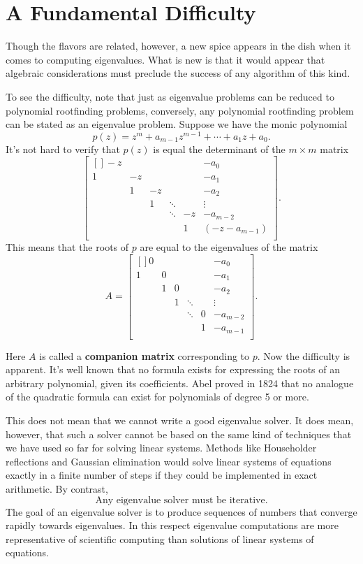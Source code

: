 \section{A Fundamental Difficulty} 
Though the flavors are related, however, a new spice appears in the dish when it comes to computing eigenvalues. What is new is that it would appear that algebraic considerations must preclude the success of any algorithm of this kind. 

To see the difficulty, note that just as eigenvalue problems can be reduced to polynomial rootfinding problems, conversely, any polynomial rootfinding problem can be stated as an eigenvalue problem. Suppose we have the monic polynomial 
\[
    p(z) = z^m + a_{m-1}z^{m-1} + \cdots + a_1z + a_0. 
\]
It's not hard to verify that $p(z)$ is equal the determinant of the $m\times m$ matrix 
\[
    \begin{bmatrix}[] 
        -z &  &  &  &  &  -a_0 \\
        1 & -z &  &  &  &  -a_1 \\
         & 1 & -z &  &  &  -a_2 \\
         &  & 1 & \ddots &  &  \vdots \\
         &  &  & \ddots & -z &  -a_{m-2} \\
         &  &  &  & 1 &  (-z-a_{m-1}) \\
    \end{bmatrix} . 
\]
This means that the roots of $p$ are equal to the eigenvalues of the matrix 
\[
    A = \begin{bmatrix}[] 
        0 &  &  &  &  &  -a_0 \\
        1 & 0 &  &  &  &  -a_1 \\
         & 1 & 0 &  &  &  -a_2 \\
         &  & 1 & \ddots &  &  \vdots \\
         &  &  & \ddots & 0 &  -a_{m-2} \\
         &  &  &  & 1 &  -a_{m-1} \\
    \end{bmatrix} . 
\]
     
Here $A$ is called a \textbf{companion matrix} corresponding to $p$.  Now the difficulty is apparent. It's well known that no formula exists for expressing the roots of an arbitrary polynomial, given its coefficients. Abel proved in 1824 that no analogue of the quadratic formula can exist for polynomials of degree 5 or more.  

This does not mean that we cannot write a good eigenvalue solver. It does mean, however, that such a solver cannot be based on the same kind of techniques that we have used so far for solving linear systems. Methods like Householder reflections and Gaussian elimination would solve linear systems of equations exactly in a finite number of steps if they could be implemented in exact arithmetic. By contrast, 
\[
    \text{ Any eigenvalue solver must be iterative. }
\]
The goal of an eigenvalue solver is to produce sequences of numbers that converge rapidly towards eigenvalues. In this respect eigenvalue computations are more representative of scientific computing than solutions of linear systems of equations.  

